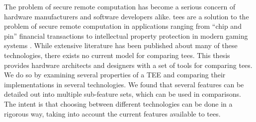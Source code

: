 The problem of secure remote computation has become a serious concern of hardware manufacturers and software developers alike. \glspl{tee} are a solution to the problem of secure remote computation in applications ranging from ``chip and pin'' financial transactions \cite{679731} to intellectual property protection in modern gaming systems \cite{da2018securing}. While extensive literature has been published about many of these technologies, there exists no current model for comparing \glspl{tee}. This thesis provides hardware architects and designers with a set of tools for comparing \glspl{tee}. We do so by examining several properties of a TEE and comparing their implementations in several technologies. We found that several features can be detailed out into multiple sub-feature sets, which can be used in comparisons. The intent is that choosing between different technologies can be done in a rigorous way, taking into account the current features available to \glspl{tee}.